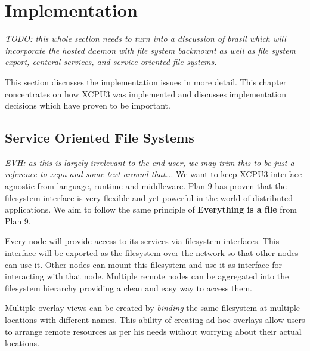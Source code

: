 \section{Implementation}

\emph{TODO: this whole section needs to turn into a discussion of brasil
which will incorporate the hosted daemon with file system backmount as well
as file system export, centeral services, and service oriented file systems.
}


This section discusses the implementation issues in more detail.  This chapter
concentrates on how XCPU3 was implemented and discusses implementation
decisions which have proven to be important.

\subsection{Service Oriented File Systems}
\emph{EVH: as this is largely irrelevant to the end user, we may trim this
to be just a reference to xcpu and some text around that...}
We want to keep XCPU3 interface agnostic from language, runtime and middleware.
Plan 9 has proven that the filesystem interface is very flexible and yet
powerful in the world of distributed applications.  We aim to follow the same
principle of \textbf{Everything is a file} from Plan 9.

Every node will provide access to its services via filesystem interfaces.
This interface will be exported as the filesystem over the network so that other
nodes can use it. Other nodes can mount this filesystem and use it as
interface for interacting with that node.  Multiple remote nodes can be
aggregated into the filesystem hierarchy providing a clean and easy way to
access them.

Multiple overlay views can be created by \textit{binding} the same filesystem
at multiple locations with different names.  This ability of creating ad-hoc
overlays allow users to arrange remote resources as per his needs without
worrying about their actual locations.

